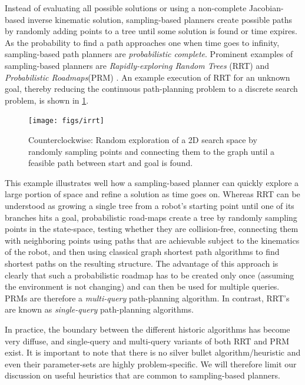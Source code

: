Instead of evaluating all possible solutions or using a non-complete Jacobian-based inverse kinematic solution, sampling-based planners create possible paths by randomly adding points to a tree until some solution is found or time expires. As the probability to find a path approaches one when time goes to infinity, sampling-based path planners are \textsl{probabilistic complete}. Prominent examples of sampling-based planners are \textsl{Rapidly-exploring Random Trees} (RRT)\cite{lavalle1998rapidly} and \textsl{Probabilistic Roadmaps}(PRM) \cite{kavraki1996probabilistic}. An example execution of RRT for an unknown goal, thereby reducing the continuous path-planning problem to a discrete search problem, is shown in \cref{fig:rrt}.

\begin{figure}
    \centering
    \texttt{[image: figs/irrt]}
    \caption{Counterclockwise: Random exploration of a 2D search space by randomly sampling points and connecting them to the graph until a feasible path between start and goal is found.\label{fig:rrt}}
\end{figure}

This example illustrates well how a sampling-based planner can quickly explore a large portion of space and refine a solution as time goes on. Whereas RRT can be understood as growing a single tree from a robot's starting point until one of its branches hits a goal, probabilistic road-maps create a tree by randomly sampling points in the state-space, testing whether they are collision-free, connecting them with neighboring points using paths that are achievable subject to the kinematics of the robot, and then using classical graph shortest path algorithms to find shortest paths on the resulting structure. The advantage of this approach is clearly that such a probabilistic roadmap has to be created only once (assuming the environment is not changing) and can then be used for multiple queries. PRMs are therefore a \textsl{multi-query} path-planning algorithm. In contrast, RRT's are known as \textsl{single-query} path-planning algorithms.

In practice, the boundary between the different historic algorithms has become very diffuse, and single-query and multi-query variants of both RRT and PRM exist. It is important to note that there is no silver bullet algorithm/heuristic and even their parameter-sets are highly problem-specific. We will therefore limit our discussion on useful heuristics that are common to sampling-based planners.

